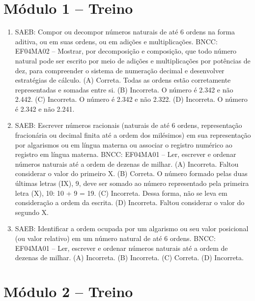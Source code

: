 \pagebreak
\pagestyle{plain}
\footnotesize

\pagecolor{gray!40}

\section*{Módulo 1 – Treino}

\begin{enumerate}
\item
SAEB: Compor ou decompor números naturais de até 6 ordens na forma aditiva, ou em suas ordens, ou em adições e multiplicações.
BNCC: EF04MA02 -- Mostrar, por decomposição e composição, que todo número natural pode ser escrito
por meio de adições e multiplicações por potências de dez, para compreender o sistema de
numeração decimal e desenvolver estratégias de cálculo.
(A) Correta. Todas as ordens estão corretamente representadas e somadas entre si.
(B) Incorreta. O número é 2.342 e não 2.442.
(C) Incorreta. O número é 2.342 e não 2.322.
(D) Incorreta. O número é 2.342 e não 2.241.

\item
SAEB: Escrever números racionais (naturais de até 6 ordens, representação fracionária ou decimal finita até a ordem dos milésimos) em sua representação por algarismos ou em língua materna ou associar o registro numérico ao registro em língua materna.
BNCC: EF04MA01 -- Ler, escrever e ordenar números naturais até a ordem de dezenas de milhar.
(A)  Incorreta. Faltou considerar o valor do primeiro X.
(B)  Correta. O número formado pelas duas últimas letras (IX), 9, deve ser somado ao número representado pela primeira letra (X), 10: 10 + 9 = 19.
(C)  Incorreta. Dessa forma, não se leva em consideração a ordem da escrita.
(D)  Incorreta. Faltou considerar o valor do segundo X.

\item
SAEB: Identificar a ordem ocupada por um algarismo ou seu valor posicional (ou valor relativo) em um número natural de até 6 ordens.
BNCC: EF04MA01 -- Ler, escrever e ordenar números naturais até a ordem de dezenas de milhar.
(A)  Incorreta. 
(B)  Incorreta. 
(C)  Correta. 
(D)  Incorreta. 
\end{enumerate}

\section*{Módulo 2 – Treino}

